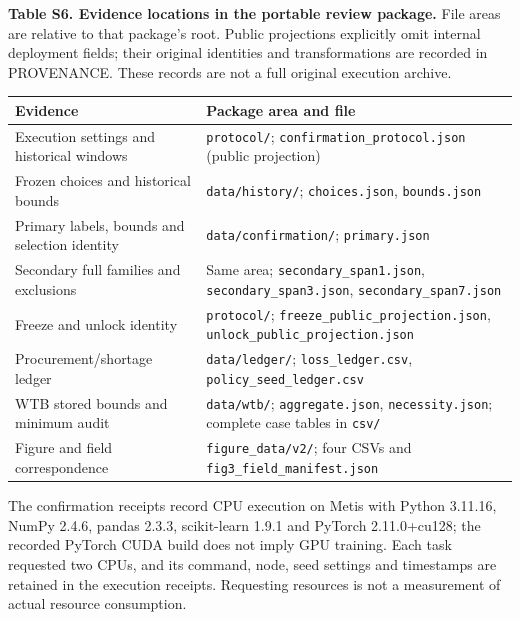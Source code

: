 \documentclass[
  british,
  11pt,
]{article}
\newcounter{none} %
\begin{document}

\textbf{Table S6. Evidence locations in the portable review package.}
File areas are relative to that package's root. Public projections
explicitly omit internal deployment fields; their original identities
and transformations are recorded in PROVENANCE. These records are not a
full original execution archive.

{\def\LTcaptype{none} %
\begin{longtable}[]{@{}
  >{\raggedright\arraybackslash}p{}
  >{\raggedright\arraybackslash}p{}@{}}
\toprule\noalign{}
\begin{minipage}[b]{\linewidth}\raggedright
Evidence
\end{minipage} & \begin{minipage}[b]{\linewidth}\raggedright
Package area and file
\end{minipage} \\
\midrule\noalign{}
\endhead
\bottomrule\noalign{}
\endlastfoot
Execution settings and historical windows & \texttt{protocol/};
\texttt{confirmation\_protocol.json} (public projection) \\
Frozen choices and historical bounds & \texttt{data/history/};
\texttt{choices.json}, \texttt{bounds.json} \\
Primary labels, bounds and selection identity &
\texttt{data/confirmation/}; \texttt{primary.json} \\
Secondary full families and exclusions & Same area;
\texttt{secondary\_span1.json}, \texttt{secondary\_span3.json},
\texttt{secondary\_span7.json} \\
Freeze and unlock identity & \texttt{protocol/};
\texttt{freeze\_public\_projection.json},
\texttt{unlock\_public\_projection.json} \\
Procurement/shortage ledger & \texttt{data/ledger/};
\texttt{loss\_ledger.csv}, \texttt{policy\_seed\_ledger.csv} \\
WTB stored bounds and minimum audit & \texttt{data/wtb/};
\texttt{aggregate.json}, \texttt{necessity.json}; complete case tables
in \texttt{csv/} \\
Figure and field correspondence & \texttt{figure\_data/v2/}; four CSVs
and \texttt{fig3\_field\_manifest.json} \\
\end{longtable}
}

The confirmation receipts record CPU execution on Metis with Python
3.11.16, NumPy 2.4.6, pandas 2.3.3, scikit-learn 1.9.1 and PyTorch
2.11.0+cu128; the recorded PyTorch CUDA build does not imply GPU
training. Each task requested two CPUs, and its command, node, seed
settings and timestamps are retained in the execution receipts.
Requesting resources is not a measurement of actual resource
consumption.
\end{document}
